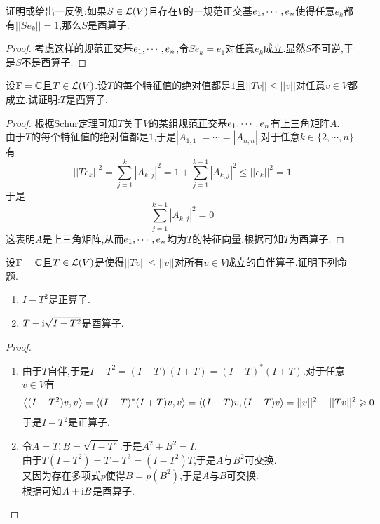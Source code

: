 \documentclass{ctexart}
\begin{document}
\begin{problem}[8.]
    证明或给出一反例:如果$S\in\mathcal{L}(V)$且存在$V$的一规范正交基${e}_1,\cdots,{e}_{n}$使得任意$e_k$都有$||Se_k||=1$,那么$S$是酉算子.
\end{problem}
\begin{proof}
    考虑这样的规范正交基${e}_1,\cdots,{e}_{n}$,令$Se_k=e_1$对任意$e_k$成立.显然$S$不可逆,于是$S$不是酉算子.
\end{proof}
\begin{problem}[9.]
    设$\mathbb{F}=\mathbb{C}$且$T\in\mathcal{L}(V)$.设$T$的每个特征值的绝对值都是$1$且$||Tv||\leqslant||v||$对任意$v\in V$都成立.试证明:$T$是酉算子.
\end{problem}
\begin{proof}
    根据Schur定理可知$T$关于$V$的某组规范正交基${e}_1,\cdots,{e}_{n}$有上三角矩阵$A$.\\
    由于$T$的每个特征值的绝对值都是$1$,于是$|A_{1,1}|=\cdots=|A_{n,n}|$.对于任意$k\in\{2,\cdots,n\}$有
    \[||Te_k||^2=\sum_{j=1}^{k}|A_{k,j}|^2=1+\sum_{j=1}^{k-1}|A_{k,j}|^2\leqslant||e_k||^2=1\]
    于是
    \[\sum_{j=1}^{k-1}|A_{k,j}|^2=0\]
    这表明$A$是上三角矩阵,从而${e}_1,\cdots,{e}_{n}$均为$T$的特征向量.根据可知$T$为酉算子.
\end{proof}
\begin{problem}[10.]
    设$\mathbb{F}=\mathbb{C}$且$T\in\mathcal{L}(V)$是使得$||Tv||\leqslant||v||$对所有$v\in V$成立的自伴算子.证明下列命题.
    \begin{enumerate}[label=\tbf{(\arabic*)}]
        \item $I-T^2$是正算子.
        \item $T+\text{i}\sqrt{I-T^2}$是酉算子.
    \end{enumerate}
\end{problem}
\begin{proof}
    \begin{enumerate}[label=\tbf{(\arabic*)}]
        \item 由于$T$自伴,于是$I-T^2=(I-T)(I+T)=(I-T)^*(I+T)$.对于任意$v\in V$有
            \[\left\langle{(I-T^2)v},{v}\right\rangle=\left\langle{(I-T)^*(I+T)v},{v}\right\rangle=\left\langle{(I+T)v},{(I-T)v}\right\rangle=||v||^2-||Tv||^2\geqslant0\]
            于是$I-T^2$是正算子.
        \item 令$A=T,B=\sqrt{I-T^2}$.于是$A^2+B^2=I$.\\
            由于$T(I-T^2)=T-T^3=(I-T^2)T$,于是$A$与$B^2$可交换.\\
            又因为存在多项式$p$使得$B=p(B^2)$,于是$A$与$B$可交换.\\
            根据可知$A+\text{i} B$是酉算子.
    \end{enumerate}
\end{proof}
\end{document}
